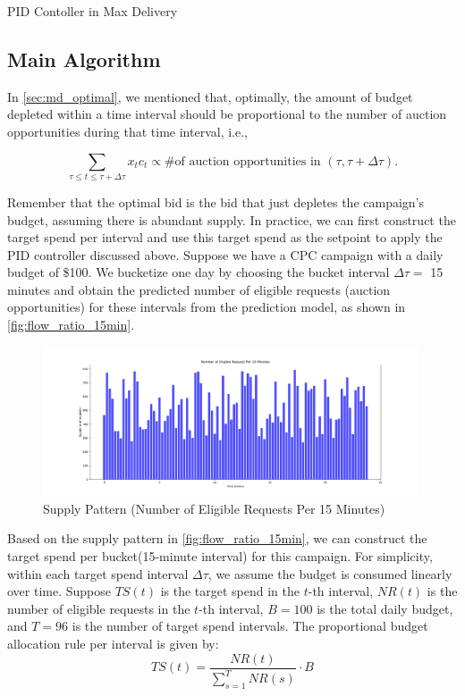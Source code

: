 \documentclass[../main.tex]{subfiles}
\begin{document}
	\begin{section}{PID Contoller in Max Delivery}
		\subsection*{Main Algorithm}
		In \autoref{sec:md_optimal}, we mentioned that, optimally, the amount of budget depleted within a time interval should be proportional to the number of auction opportunities during that time interval, i.e.,

		\[
		\sum_{\tau \leq t \leq \tau + \Delta \tau} x_t c_t \propto \text{\# of auction opportunities in } (\tau, \tau + \Delta\tau).
		\]
		
		Remember that the optimal bid is the bid that just depletes the campaign's budget, assuming there is abundant supply. In practice, we can first construct the target spend per interval and use this target spend as the setpoint to apply the PID controller discussed above. Suppose we have a CPC campaign with a daily budget of \$100. We bucketize one day by choosing the bucket interval $\Delta\tau =$ 15 minutes and obtain the predicted number of eligible requests (auction opportunities) for these intervals from the prediction model, as shown in \autoref{fig:flow_ratio_15min}.
		
		\begin{figure}[H]
			\centering
			\includegraphics[width=0.99\textwidth]{../Images/flow_ratio_15min.png}
			\caption{Supply Pattern (Number of Eligible Requests Per 15 Minutes)}
			\label{fig:flow_ratio_15min}
		\end{figure}
		
		Based on the supply pattern in \autoref{fig:flow_ratio_15min}, we can construct the target spend per bucket(15-minute interval) for this campaign. For simplicity, within each target spend interval $\Delta\tau$, we assume the budget is consumed linearly over time. Suppose \(TS(t)\) is the target spend in the \(t\)-th interval, \(NR(t)\) is the number of eligible requests in the \(t\)-th interval, \(B = 100\) is the total daily budget, and \(T = 96\) is the number of target spend intervals. The proportional budget allocation rule per interval is given by:
			\[
				TS(t) = \frac{NR(t)}{\sum_{s=1}^{T} NR(s)} \cdot B
			\]
			

\end{section}
\end{document}
